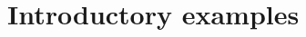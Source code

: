 \documentclass[graybox,envcountchap,sectrefs]{svmono_mod}
\begin{document}

%

\chapter{Introductory examples}
\label{introB}



\backmatter%
%
%
\printindex
\end{document}
